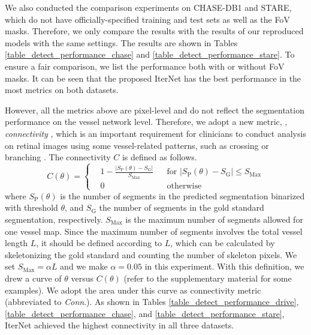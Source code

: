 \documentclass[10pt,twocolumn,letterpaper]{article}
\begin{document}
We also conducted the comparison experiments on CHASE-DB1 and STARE, which do not have officially-specified training and test sets as well as the FoV masks. Therefore, we only compare the results with the results of our reproduced models with the same settings. The results are shown in Tables \ref{table_detect_performance_chase} and \ref{table_detect_performance_stare}. To ensure a fair comparison, we list the performance both with or without FoV masks.
It can be seen that the proposed IterNet has the best performance in the most metrics on both datasets.

However, all the metrics above are pixel-level and do not reflect the segmentation performance on the vessel network level. Therefore, we adopt a new metric, \ie, \textit{connectivity} \cite{MOCCIA201871,6019055}, which is an important requirement for clinicians to conduct analysis on retinal images using some vessel-related patterns, such as crossing or branching \cite{kawasaki}. The connectivity $C$ is defined as follows.
\begin{equation}
    C(\theta) =\left\{
	\begin{aligned}
	&1 - \frac{|S_\text{P}(\theta)-S_\text{G}|}{S_\text{Max}} & & \text{for }  |S_{\text{P}}(\theta)-S_\text{G}|\leq S_\text{Max}\\
	&0 & & \text{otherwise} \end{aligned}
	\right.
\end{equation}
where $S_\text{P}(\theta)$ is the number of segments in the predicted segmentation binarized with threshold $\theta$, and $S_\text{G}$ the number of segments in the gold standard segmentation, respectively. $S_\text{Max}$ is the maximum number of segments allowed for one vessel map. Since the maximum number of segments involves the total vessel length $L$, it should be defined according to $L$, which can be calculated by skeletonizing the gold standard and counting the number of skeleton pixels. We set $S_\text{Max}=\alpha L$ and we make $\alpha=0.05$ in this experiment. With this definition, we drew a curve of $\theta$ versus $C(\theta)$ (refer to the supplementary material for some examples). We adopt the area under this curve as connectivity metric (abbreviated to \emph{Conn}.).
As shown in Tables \ref{table_detect_performance_drive}, \ref{table_detect_performance_chase}, and \ref{table_detect_performance_stare}, IterNet achieved the highest connectivity in all three datasets.
\end{document}
